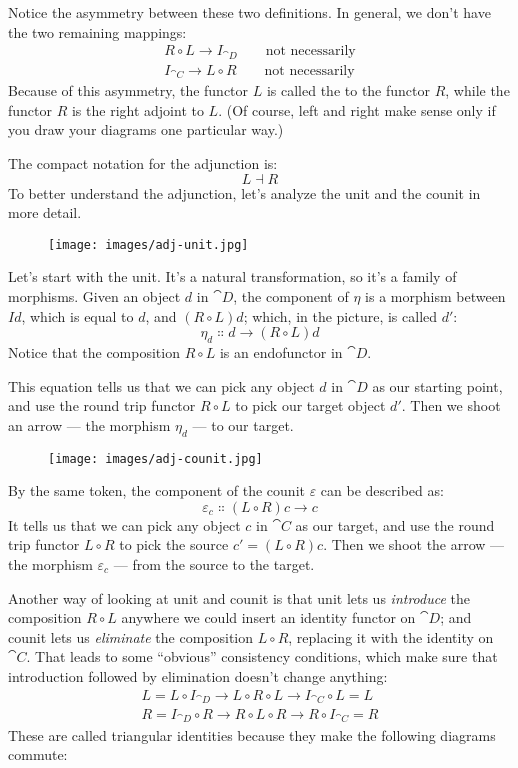 Notice the asymmetry between these two definitions. In general, we don't
have the two remaining mappings:
\begin{gather*}
  R \circ L \to I_{\cat{D}} \quad\quad\text{not necessarily} \\
  I_{\cat{C}} \to L \circ R \quad\quad\text{not necessarily}
\end{gather*}
Because of this asymmetry, the functor $L$ is called the
 to the functor $R$, while the functor
$R$ is the right adjoint to $L$. (Of course, left and
right make sense only if you draw your diagrams one particular way.)

The compact notation for the adjunction is:
\[L \dashv R\]
To better understand the adjunction, let's analyze the unit and the
counit in more detail.

\begin{figure}[H]
  \centering
  \texttt{[image: images/adj-unit.jpg]}
\end{figure}

\noindent
Let's start with the unit. It's a natural transformation, so it's a
family of morphisms. Given an object $d$ in $\cat{D}$, the
component of $\eta$ is a morphism between $I d$, which is equal to
$d$, and $(R \circ L) d$; which, in the picture, is called
$d'$:
\[\eta_d \Colon d \to (R \circ L) d\]
Notice that the composition $R \circ L$ is an endofunctor in $\cat{D}$.

This equation tells us that we can pick any object $d$ in
$\cat{D}$ as our starting point, and use the round trip functor
$R \circ L$ to pick our target object $d'$. Then we
shoot an arrow --- the morphism $\eta_d$ --- to our target.

\begin{figure}[H]
  \centering
  \texttt{[image: images/adj-counit.jpg]}
\end{figure}

\noindent
By the same token, the component of the counit $\varepsilon$ can be described as:
\[\varepsilon_{c} \Colon (L \circ R) c \to c\]
It tells us that we
can pick any object $c$ in $\cat{C}$ as our target, and use the
round trip functor $L \circ R$ to pick the source
$c' = (L \circ R) c$. Then we shoot the arrow --- the morphism
$\varepsilon_{c}$ --- from the source to the target.

Another way of looking at unit and counit is that unit lets us
\emph{introduce} the composition $R \circ L$ anywhere we could
insert an identity functor on $\cat{D}$; and counit lets us
\emph{eliminate} the composition $L \circ R$, replacing it with the
identity on $\cat{C}$. That leads to some ``obvious'' consistency
conditions, which make sure that introduction followed by elimination
doesn't change anything:
\begin{gather*}
  L = L \circ I_{\cat{D}} \to L \circ R \circ L \to I_{\cat{C}} \circ L = L \\
  R = I_{\cat{D}} \circ R \to R \circ L \circ R \to R \circ I_{\cat{C}} = R
\end{gather*}
These are called triangular identities because they make the following
diagrams commute:

